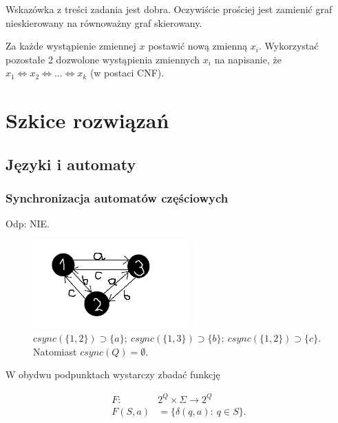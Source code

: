 \documentclass[a4paper,11pt]{article}
\newenvironment{zadanie}[1]
  {\renewcommand\theinnercustomthm{#1}\innercustomthm}
  {\endinnercustomthm}
\begin{document}
\begin{zadanie}{145}
Wskazówka z treści zadania jest dobra. Oczywiście prościej jest zamienić graf nieskierowany na równoważny graf skierowany.
\end{zadanie}

\begin{zadanie}{148}
Za każde wystąpienie zmiennej $x$ postawić nową zmienną $x_i$. Wykorzystać pozostałe 2 dozwolone wystąpienia zmiennych $x_i$
na napisanie, że $x_1 \Leftrightarrow x_2 \Leftrightarrow ... \Leftrightarrow x_k$ (w postaci CNF).
\end{zadanie}



\section{Szkice rozwiązań}

\subsection{Języki i automaty}

\subsubsection{Synchronizacja automatów częściowych}

\begin{zadanie}{40}
\end{zadanie}

Odp: NIE. \\


\begin{figure}[h!]
  \centerline{%
    \includegraphics[width=6cm]{zad40.png}%
  }%
  \caption{$csync(\{1,2\}) \supset \{a\}; \ csync(\{1,3\}) \supset \{b\};\ csync(\{1,2\}) \supset \{c\}$. Natomiast $csync(Q) = \emptyset $.}
\end{figure}


\begin{zadanie}{41}
\end{zadanie}
W obydwu podpunktach wystarczy zbadać funkcję

\begin{align*}
 F :\ &2^Q \times \Sigma \longrightarrow 2^Q \\
 F(S,a) &= \{ \delta(q,a) : \ q \in S \}.
\end{align*}
\end{document}
